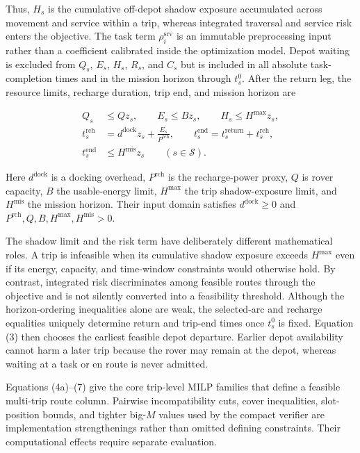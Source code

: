 \documentclass[
  11pt,
]{article}
\begin{document}
Thus, \(H_s\) is the cumulative off-depot shadow exposure accumulated
across movement and service within a trip, whereas integrated traversal
and service risk enters the objective. The task term
\(\rho_i^{\mathrm{srv}}\) is an immutable preprocessing input rather
than a coefficient calibrated inside the optimization model. Depot
waiting is excluded from \(Q_s\), \(E_s\), \(H_s\), \(R_s\), and \(C_s\)
but is included in all absolute task-completion times and in the mission
horizon through \(t_s^0\). After the return leg, the resource limits,
recharge duration, trip end, and mission horizon are

\[
\begin{aligned}
Q_s&\le Qz_s,\qquad
E_s\le Bz_s,\qquad
H_s\le H^{\max}z_s,\\
t_s^{\mathrm{rch}}
&=d^{\mathrm{dock}}z_s+\frac{E_s}{P^{\mathrm{rch}}},
\qquad
t_s^{\mathrm{end}}
=t_s^{\mathrm{return}}+t_s^{\mathrm{rch}},\\
t_s^{\mathrm{end}}&\le H^{\mathrm{mis}}z_s
\qquad (s\in\mathcal{S}).
\end{aligned}
\tag{7}
\]

Here \(d^{\mathrm{dock}}\) is a docking overhead, \(P^{\mathrm{rch}}\)
is the recharge-power proxy, \(Q\) is rover capacity, \(B\) the
usable-energy limit, \(H^{\max}\) the trip shadow-exposure limit, and
\(H^{\mathrm{mis}}\) the mission horizon. Their input domain satisfies
\(d^{\mathrm{dock}}\ge0\) and
\(P^{\mathrm{rch}},Q,B,H^{\max},H^{\mathrm{mis}}>0\).

The shadow limit and the risk term have deliberately different
mathematical roles. A trip is infeasible when its cumulative shadow
exposure exceeds \(H^{\max}\) even if its energy, capacity, and
time-window constraints would otherwise hold. By contrast, integrated
risk discriminates among feasible routes through the objective and is
not silently converted into a feasibility threshold. Although the
horizon-ordering inequalities alone are weak, the selected-arc and
recharge equalities uniquely determine return and trip-end times once
\(t_s^0\) is fixed. Equation (3) then chooses the earliest feasible
depot departure. Earlier depot availability cannot harm a later trip
because the rover may remain at the depot, whereas waiting at a task or
en route is never admitted.

Equations (4a)--(7) give the core trip-level MILP families that define a
feasible multi-trip route column. Pairwise incompatibility cuts, cover
inequalities, slot-position bounds, and tighter big-\(M\) values used by
the compact verifier are implementation strengthenings rather than
omitted defining constraints. Their computational effects require
separate evaluation.
\end{document}

